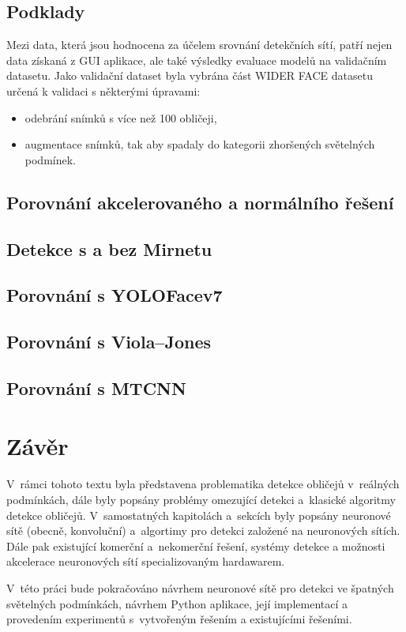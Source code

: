 \section{Podklady}
\label{sekce:podklady}


Mezi data, která jsou hodnocena za účelem srovnání detekčních sítí, patří nejen data získaná z GUI aplikace, ale také výsledky evaluace modelů na validačním datasetu. Jako validační dataset byla vybrána část WIDER FACE datasetu určená k validaci s některými úpravami:
\begin{itemize}
  \item odebrání snímků s více než 100 obličeji,
  \item augmentace snímků, tak aby spadaly do kategorii zhoršených světelných podmínek.
\end{itemize}

\section{Porovnání akcelerovaného a normálního řešení}


\section{Detekce s a bez Mirnetu}

\section{Porovnání s YOLOFacev7}

\section{Porovnání s Viola--Jones}

\section{Porovnání s MTCNN}

\chapter{Závěr}
\label{kapitola:zaver}
V~rámci tohoto textu byla představena problematika detekce obličejů v~reálných podmínkách, dále byly popsány problémy omezující detekci a~klasické algoritmy detekce obličejů. V~samostatných kapitolách a~sekcích byly popsány neuronové sítě (obecně, konvoluční) a~algortimy pro detekci založené na neuronových sítích. Dále pak existující komerční a~nekomerční řešení, systémy detekce a možnosti akcelerace neuronových sítí specializovaným hardawarem.

V~této práci bude pokračováno návrhem neuronové sítě pro detekci ve špatných světelných podmínkách, návrhem Python aplikace, její implementací a provedením experimentů s~vytvořeným řešením a existujícími řešeními.